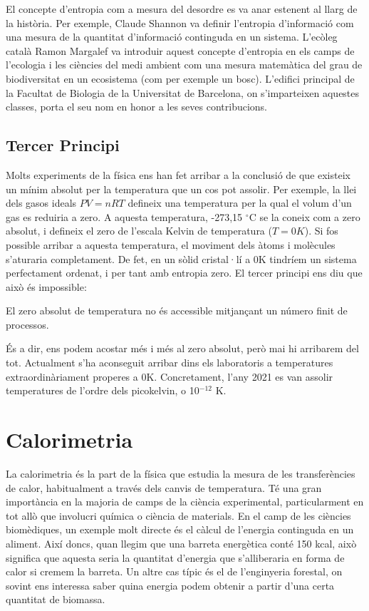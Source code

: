 \documentclass[12pt]{book}
\begin{document}
El concepte d'entropia com a mesura del desordre es va anar estenent al llarg de la història. Per exemple, Claude Shannon va definir l'entropia d'informació com una mesura de la quantitat d'informació continguda en un sistema. L'ecòleg català Ramon Margalef va introduir aquest concepte d'entropia en els camps de l'ecologia i les ciències del medi ambient com una mesura matemàtica del grau de biodiversitat en un ecosistema (com per exemple un bosc). L'edifici principal de la Facultat de Biologia de la Universitat de Barcelona, on s'imparteixen aquestes classes, porta el seu nom en honor a les seves contribucions.

\subsection{Tercer Principi}

Molts experiments de la física ens han fet arribar a la conclusió de que existeix un mínim absolut per la temperatura que un cos pot assolir. Per exemple, la llei dels gasos ideals $PV = nRT$ defineix una temperatura per la qual el volum d'un gas es reduiria a zero. A aquesta temperatura, -273,15 $^\circ$C se la coneix com a zero absolut, i defineix el zero de l'escala Kelvin de temperatura ($T = 0K$). Si fos possible arribar a aquesta temperatura, el moviment dels àtoms i molècules s'aturaria completament. De fet, en un sòlid cristal·lí a 0K tindríem un sistema perfectament ordenat, i per tant amb entropia zero. El tercer principi ens diu que això és impossible:

\begin{mdframed}
\begin{it}
    El zero absolut de temperatura no és accessible mitjançant un número finit de processos.
\end{it}
\end{mdframed}

És a dir, ens podem acostar més i més al zero absolut, però mai hi arribarem del tot. Actualment s'ha aconseguit arribar dins els laboratoris a temperatures extraordinàriament properes a 0K. Concretament, l'any 2021 es van assolir temperatures de l'ordre dels picokelvin, o 10$^{-12}$ K.

\section{Calorimetria}

La calorimetria és la part de la física que estudia la mesura de les transferències de calor, habitualment a través dels canvis de temperatura. Té una gran importància en la majoria de camps de la ciència experimental, particularment en tot allò que involucri química o ciència de materials. En el camp de les ciències biomèdiques, un exemple molt directe és el càlcul de l'energia continguda en un aliment. Així doncs, quan llegim que una barreta energètica conté 150 kcal,  això significa que aquesta seria la quantitat d'energia que s'alliberaria en forma de calor si cremem la barreta. Un altre cas típic és el de l'enginyeria forestal, on sovint ens interessa saber quina energia podem obtenir a partir d'una certa quantitat de biomassa. 
\end{document}
